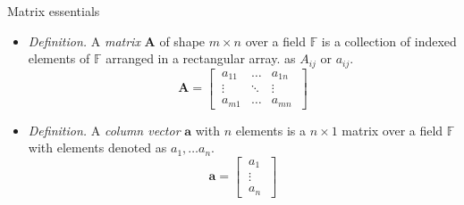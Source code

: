 \documentclass{beamer}
\numberwithin{equation}{section}
\begin{document}
\begin{frame}{Matrix essentials}
    \begin{itemize}
        \item
        \textit{Definition.} A \textit{matrix} $ \mathbf{A} $ of shape
        $ m \times n $ over a field\footnotemark{} $ \mathbb{F} $ is a collection of indexed elements of $ \mathbb{F} $
        arranged in a rectangular array.
        as $ A_{ij} $ or $ a_{ij} $.
        \begin{equation*}
            \mathbf{A} = \begin{bmatrix}
                \ a_{11} & \ldots & a_{1n} \ \\
                \ \vdots & \ddots & \vdots \ \\
                \ a_{m1} & \ldots & a_{mn} \
            \end{bmatrix}
        \end{equation*}

        \item
        \textit{Definition.} A \textit{column vector} $ \mathbf{a} $ with
        $ n $ elements is a $ n \times 1 $ matrix over a field $ \mathbb{F} $
        with elements denoted as $ a_1, \ldots a_n $.
        \begin{equation*}
            \mathbf{a} = \begin{bmatrix}
                \ a_1 \ \\ \ \vdots \ \\ \ a_n \
            \end{bmatrix}
        \end{equation*}
    \end{itemize}
\end{frame}
\end{document}
